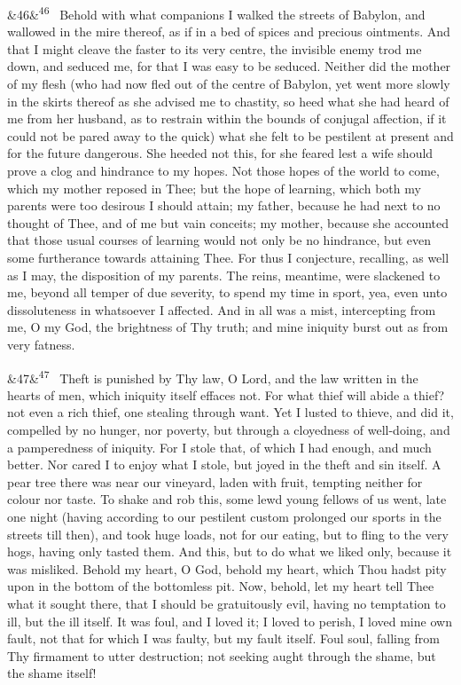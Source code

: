 \documentclass[12pt]{article}
\newcommand{\para}[1][]{\par\noindent\ifx&#1&\else\textsuperscript{\footnotesize #1}~\fi}
\begin{document}
\para[46] Behold with what companions I walked the streets of Babylon, and wallowed in the mire thereof, as if in a bed of spices and precious ointments. And that I might cleave the faster to its very centre, the invisible enemy trod me down, and seduced me, for that I was easy to be seduced. Neither did the mother of my flesh (who had now fled out of the centre of Babylon, yet went more slowly in the skirts thereof as she advised me to chastity, so heed what she had heard of me from her husband, as to restrain within the bounds of conjugal affection, if it could not be pared away to the quick) what she felt to be pestilent at present and for the future dangerous. She heeded not this, for she feared lest a wife should prove a clog and hindrance to my hopes. Not those hopes of the world to come, which my mother reposed in Thee; but the hope of learning, which both my parents were too desirous I should attain; my father, because he had next to no thought of Thee, and of me but vain conceits; my mother, because she accounted that those usual courses of learning would not only be no hindrance, but even some furtherance towards attaining Thee. For thus I conjecture, recalling, as well as I may, the disposition of my parents. The reins, meantime, were slackened to me, beyond all temper of due severity, to spend my time in sport, yea, even unto dissoluteness in whatsoever I affected. And in all was a mist, intercepting from me, O my God, the brightness of Thy truth; and mine iniquity burst out as from very fatness.

\para[47] Theft is punished by Thy law, O Lord, and the law written in the hearts of men, which iniquity itself effaces not. For what thief will abide a thief? not even a rich thief, one stealing through want. Yet I lusted to thieve, and did it, compelled by no hunger, nor poverty, but through a cloyedness of well-doing, and a pamperedness of iniquity. For I stole that, of which I had enough, and much better. Nor cared I to enjoy what I stole, but joyed in the theft and sin itself. A pear tree there was near our vineyard, laden with fruit, tempting neither for colour nor taste. To shake and rob this, some lewd young fellows of us went, late one night (having according to our pestilent custom prolonged our sports in the streets till then), and took huge loads, not for our eating, but to fling to the very hogs, having only tasted them. And this, but to do what we liked only, because it was misliked. Behold my heart, O God, behold my heart, which Thou hadst pity upon in the bottom of the bottomless pit. Now, behold, let my heart tell Thee what it sought there, that I should be gratuitously evil, having no temptation to ill, but the ill itself. It was foul, and I loved it; I loved to perish, I loved mine own fault, not that for which I was faulty, but my fault itself. Foul soul, falling from Thy firmament to utter destruction; not seeking aught through the shame, but the shame itself!
\end{document}
